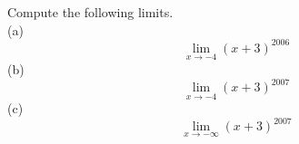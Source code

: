 Compute the following limits.\\
(a)
\begin{equation*}
  \lim_{x\rightarrow-4} (x+3)^{2006}
\end{equation*}
(b)
\begin{equation*}
  \lim_{x\rightarrow-4} (x+3)^{2007}
\end{equation*}
(c)
\begin{equation*}
  \lim_{x\rightarrow-\infty} (x+3)^{2007}
\end{equation*}
